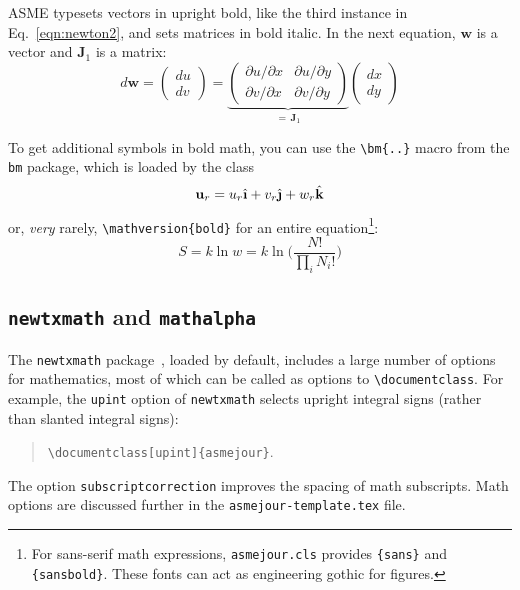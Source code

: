 \documentclass[subscriptcorrection,upint,varvw,barcolor=Goldenrod3,mathalfa=cal=euler,balance,hyphenate,french,pdf-a]{asmejour} %
\begin{document}
ASME typesets vectors in upright bold, like the third instance in Eq.\ \eqref{eqn:newton2}, and sets matrices in bold italic. In the next equation, $\mathbf{w}$ is a vector and  $\bm{J}_1$ is a matrix:
\begin{equation}\label{eqn:dw}
d\mathbf{w} =
   \begin{pmatrix}
 	du \\ dv
   \end{pmatrix} = 
   \underbrace{\begin{pmatrix}
	 \partial u/\partial x &  \partial u/\partial y \\
	 \partial v/\partial x &  \partial v/\partial y
   \end{pmatrix}}_{=\,\bm{J}_1}  \begin{pmatrix}
 	dx \\ dy
   \end{pmatrix} 
\end{equation}

To get additional symbols in bold math, you can use the \verb|\bm{..}| macro from the \texttt{bm} package, which is loaded by the class
\begin{equation}
\mathbf{u}_r = u_r\bm{\hat{\textbf{\i}}}+v_r\bm{\hat{\textbf{\j}}}+w_r\bm{\hat{\textbf{k}}}
\end{equation}
or, \textit{very} rarely, \verb|\mathversion{bold}| for an entire equation\footnote{For sans-serif math expressions, \texttt{asmejour.cls} provides \texttt{\string\mathversion \{sans\}} and \texttt{\string\mathversion \{sansbold\}}. These fonts can act as engineering gothic for figures.}: 
\begin{equation}
S = k \ln w = k \ln \biggl(\frac{N!}{\prod_i N_i!}\biggr)
\end{equation}


\subsection{\texttt{newtxmath} and \texttt{mathalpha}} The \texttt{newtxmath} package~\cite{sharpe1}, loaded by default, includes a large number of options for mathematics, most of which can be called as options to \verb|\documentclass|. For example, the \texttt{upint} option of \texttt{newtxmath} selects upright integral signs (rather than slanted integral signs):
\begin{quote}
\verb|\documentclass[upint]{asmejour}|. 
\end{quote}  
The option \verb|subscriptcorrection| improves the spacing of math subscripts. Math options are discussed further in the \texttt{asmejour-template.tex} file. 
\end{document}
